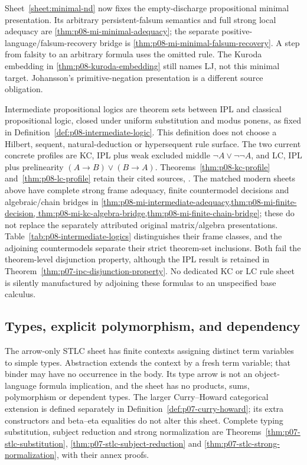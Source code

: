 Sheet~\ref{sheet:minimal-nd} now fixes the empty-discharge propositional
minimal presentation. Its arbitrary persistent-falsum semantics and full
strong local adequacy are \cref{thm:p08-mi-minimal-adequacy}; the separate
positive-language/falsum-recovery bridge is
\cref{thm:p08-mi-minimal-falsum-recovery}. A step from falsity to an
arbitrary formula uses the omitted rule. The Kuroda embedding in
\cref{thm:p08-kuroda-embedding} still names LJ, not this minimal target.
Johansson's primitive-negation presentation is a different source obligation.


Intermediate propositional logics are theorem sets between IPL and
classical propositional logic, closed under uniform substitution and
modus ponens, as fixed in Definition~\ref{def:p08-intermediate-logic}.
This definition does not choose a Hilbert, sequent, natural-deduction or
hypersequent rule surface.  The two current concrete profiles are
KC, IPL plus weak excluded middle \(\neg A\lor\neg\neg A\), and LC,
IPL plus prelinearity \((A\to B)\lor(B\to A)\).
Theorems~\ref{thm:p08-kc-profile} and~\ref{thm:p08-lc-profile} retain
their cited sources, \cite{Jankov1968WeakExcludedMiddle,Dummett1959}.
The matched modern sheets above have complete strong frame adequacy,
finite countermodel decisions and algebraic/chain bridges in
\cref{thm:p08-mi-intermediate-adequacy,thm:p08-mi-finite-decision,
thm:p08-mi-kc-algebra-bridge,thm:p08-mi-finite-chain-bridge}; these do not
replace the separately attributed original matrix/algebra presentations.
Table~\ref{tab:p08-intermediate-logics} distinguishes their frame classes,
and the adjoining countermodels separate their strict theorem-set
inclusions.  Both fail the theorem-level disjunction property, although
the IPL result is retained in
Theorem~\ref{thm:p07-ipc-disjunction-property}.  No dedicated KC or LC
rule sheet is silently manufactured by adjoining these formulas to an
unspecified base calculus.

\subsection{Types, explicit polymorphism, and dependency}

The arrow-only STLC sheet has finite contexts assigning distinct term
variables to simple types.  Abstraction extends the context by a fresh
term variable; that binder may have no occurrence in the body.  Its type
arrow is not an object-language formula implication, and the sheet has no
products, sums, polymorphism or dependent types.  The larger
Curry--Howard categorical extension is defined separately in
Definition~\ref{def:p07-curry-howard}; its extra constructors and
beta--eta equalities do not alter this sheet.  Complete typing substitution,
subject reduction and strong normalization are
Theorems~\ref{thm:p07-stlc-substitution},
\ref{thm:p07-stlc-subject-reduction} and
\ref{thm:p07-stlc-strong-normalization}, with their annex proofs.


